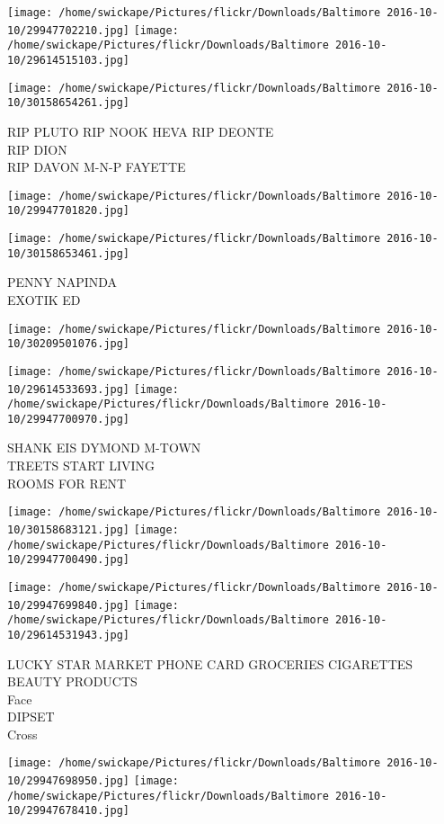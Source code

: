 \documentclass[10pt,letterpaper]{article}
\begin{document}
\texttt{[image: /home/swickape/Pictures/flickr/Downloads/Baltimore 2016-10-10/29947702210.jpg]}
\texttt{[image: /home/swickape/Pictures/flickr/Downloads/Baltimore 2016-10-10/29614515103.jpg]}

\texttt{[image: /home/swickape/Pictures/flickr/Downloads/Baltimore 2016-10-10/30158654261.jpg]}

RIP PLUTO RIP NOOK HEVA RIP DEONTE\\
RIP DION\\
RIP DAVON M{-}N{-}P FAYETTE
\pagebreak

\texttt{[image: /home/swickape/Pictures/flickr/Downloads/Baltimore 2016-10-10/29947701820.jpg]}

\vspace{0.25in}
\texttt{[image: /home/swickape/Pictures/flickr/Downloads/Baltimore 2016-10-10/30158653461.jpg]}

PENNY NAPINDA\\
EXOTIK ED
\pagebreak

\texttt{[image: /home/swickape/Pictures/flickr/Downloads/Baltimore 2016-10-10/30209501076.jpg]}

\vspace{0.25in}
\texttt{[image: /home/swickape/Pictures/flickr/Downloads/Baltimore 2016-10-10/29614533693.jpg]}
\texttt{[image: /home/swickape/Pictures/flickr/Downloads/Baltimore 2016-10-10/29947700970.jpg]}

SHANK EIS DYMOND M{-}TOWN\\
TREETS START LIVING\\
ROOMS FOR RENT
\pagebreak

\texttt{[image: /home/swickape/Pictures/flickr/Downloads/Baltimore 2016-10-10/30158683121.jpg]}
\texttt{[image: /home/swickape/Pictures/flickr/Downloads/Baltimore 2016-10-10/29947700490.jpg]}

\texttt{[image: /home/swickape/Pictures/flickr/Downloads/Baltimore 2016-10-10/29947699840.jpg]}
\texttt{[image: /home/swickape/Pictures/flickr/Downloads/Baltimore 2016-10-10/29614531943.jpg]}

LUCKY STAR MARKET PHONE CARD GROCERIES CIGARETTES BEAUTY PRODUCTS\\
Face\\
DIPSET\\
Cross
\pagebreak

\texttt{[image: /home/swickape/Pictures/flickr/Downloads/Baltimore 2016-10-10/29947698950.jpg]}
\texttt{[image: /home/swickape/Pictures/flickr/Downloads/Baltimore 2016-10-10/29947678410.jpg]}
\end{document}
